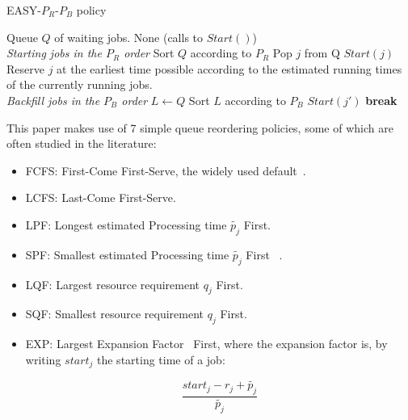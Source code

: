 \begin{algorithm}[H]
  \caption{EASY-$P_R$-$P_B$ policy}
  \begin{algorithmic}[1]
    \renewcommand{\algorithmicrequire}{\textbf{Input:}}
    \renewcommand{\algorithmicensure}{\textbf{Output:}}
    \REQUIRE Queue $Q$ of waiting jobs.
    \ENSURE None (calls to $Start()$)
    \\ \textit{Starting jobs in the $P_R$ order}
    \STATE Sort $Q$ according to $P_R$
    \STATE Pop $j$ from Q
    \STATE $Start(j)$
    \ELSE
    \STATE Reserve $j$ at the earliest
    time possible according to the estimated running times
    of the currently running jobs.
    \\ \textit{Backfill jobs in the $P_B$ order}
    \STATE $L \leftarrow Q$
    \STATE Sort $L$ according to $P_B$
    \STATE $Start(j')$
    \ENDIF
    \ENDFOR
    \STATE \textbf{break}
    \ENDIF
    \ENDFOR
  \end{algorithmic}
  \label{alg:EASY}
\end{algorithm}

This paper makes use of 7 simple queue reordering policies, some of which are
often studied in the literature:


\begin{itemize}
  \item FCFS: First-Come First-Serve, the widely used default~\cite{easy}.
  \item LCFS: Last-Come First-Serve.
  \item LPF: Longest estimated Processing time $\widetilde{p_{j}}$ First.
  \item SPF: Smallest estimated Processing time $\widetilde{p_{j}}$ First ~\cite{bfchar}.
  \item LQF: Largest resource requirement $q_j$ First.
  \item SQF: Smallest resource requirement $q_j$ First.

  \item EXP: Largest Expansion Factor~\cite{bfchar} First, where the expansion
    factor is, by writing $start_j$ the starting time of a job:

  \begin{equation} \frac{start_j - r_j + \widetilde{p_j}}{\widetilde{p_j}} \end{equation}
\end{itemize}

